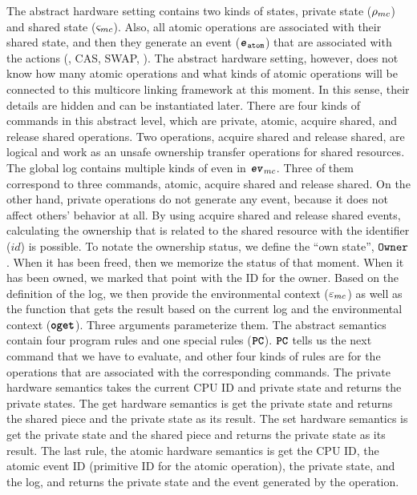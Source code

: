The abstract hardware setting contains two kinds of states, private state (${\rho_{mc}}$) and shared state (${\varsigma_{mc}}$). 
Also, all atomic operations are associated with their shared state, and then they generate an event (${{\mathrm{\texttt{\textbf{\textit{e}}}}}_{{\mathrm{\texttt{atom}}}}}$) that 
are associated with the actions (\eg, CAS, SWAP, \etc).
The abstract hardware setting, however, 
does not know how many atomic operations and what kinds of atomic operations 
will be connected to this multicore linking framework at this moment.
In this sense, their details are hidden and can be instantiated later. 
There are four kinds of commands in this abstract level, 
which are private, atomic, acquire shared, and release shared operations. 
Two operations, acquire shared and release shared, are logical and work as an unsafe ownership transfer operations for shared resources. 
The global log contains multiple kinds of even in ${{\mathrm{\texttt{\textbf{\textit{ev}}}}}_{mc}}$. 
Three of them correspond to three commands, atomic, acquire shared and release shared. 
On the other hand, private operations do not generate any event, because it does not affect others' behavior at all. 
By using acquire shared and release shared events,
calculating the ownership that is related to the shared resource with the identifier ($id$) is possible. 
To notate the ownership status, we define the ``own state'', ${{\mathrm{\texttt{Owner}}}}$.
When it has been freed, then we memorize the status of that moment. 
When it has been owned, we marked that point with the ID for the owner. 
Based on the definition of the log, 
we then provide the environmental context (${\varepsilon_{mc}}$)
as well as the function that gets the result based on the current log and the environmental context (${{\mathrm{\texttt{\textbf{oget}}}}}$). 
Three arguments parameterize them. 
The abstract semantics contain 
four program rules and one special rules (${{\mathrm{\texttt{\textbf{PC}}}}}$). 
${{\mathrm{\texttt{\textbf{PC}}}}}$ tells us the next command that we have to evaluate, 
and other four kinds of rules are for the operations that are associated with the corresponding commands.
The private hardware semantics takes the current CPU ID and private state and returns the private states. 
The get hardware semantics is get the private  state and returns the shared piece and the private state as its result. 
The set hardware semantics is get the private  state and the shared piece and returns the private state as its result. 
The last rule, the atomic hardware semantics is get the CPU ID, the atomic event ID (primitive ID for the atomic operation), 
the private state, and the log, and returns the private state and the event generated by the operation. 


